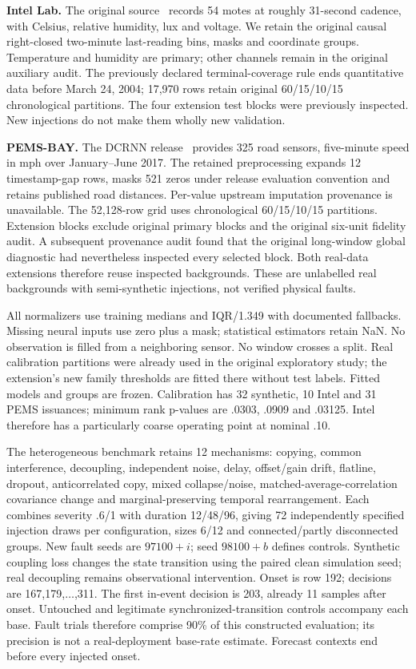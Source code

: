 \documentclass[conference]{IEEEtran}
\begin{document}
\textbf{Intel Lab.} The original source~\cite{intel} records 54 motes at roughly
31-second cadence, with Celsius, relative humidity, lux and voltage. We retain
the original causal right-closed two-minute last-reading bins, masks and
coordinate groups. Temperature and humidity are primary; other channels remain
in the original auxiliary audit. The previously declared terminal-coverage
rule ends quantitative data before March 24, 2004; 17,970 rows retain original
60/15/10/15 chronological partitions. The four extension test blocks were
previously inspected. New injections do not make them wholly new validation.

\textbf{PEMS-BAY.} The DCRNN release~\cite{dcrnn} provides 325 road sensors,
five-minute speed in mph over January--June 2017. The retained preprocessing
expands 12 timestamp-gap rows, masks 521 zeros under release evaluation
convention and retains published road distances. Per-value upstream imputation
provenance is unavailable. The 52,128-row grid uses chronological 60/15/10/15
partitions. Extension blocks exclude original primary blocks and the original
six-unit fidelity audit. A subsequent provenance audit found that the original
long-window global diagnostic had nevertheless inspected every selected block.
Both real-data extensions therefore reuse inspected backgrounds. These are unlabelled real backgrounds
with semi-synthetic injections, not verified physical faults.

All normalizers use training medians and IQR/1.349 with documented fallbacks.
Missing neural inputs use zero plus a mask; statistical estimators retain NaN.
No observation is filled from a neighboring sensor. No window crosses a split.
Real calibration partitions were already used in the original exploratory
study; the extension's new family thresholds are fitted there without test
labels. Fitted models and groups are frozen. Calibration has 32 synthetic,
10 Intel and 31 PEMS issuances; minimum rank p-values are .0303, .0909 and .03125.
Intel therefore has a particularly coarse operating point at nominal .10.

The heterogeneous benchmark retains 12 mechanisms: copying, common interference,
decoupling, independent noise, delay, offset/gain drift, flatline, dropout,
anticorrelated copy, mixed collapse/noise, matched-average-correlation covariance
change and marginal-preserving temporal rearrangement. Each combines severity
.6/1 with duration 12/48/96, giving 72 independently specified injection draws
per configuration, sizes 6/12 and connected/partly disconnected groups. New
fault seeds are $97100+i$; seed $98100+b$ defines controls. Synthetic coupling
loss changes the state transition using the paired clean simulation seed;
real decoupling remains observational intervention. Onset is row 192; decisions
are 167,179,$\ldots$,311. The first in-event decision is 203, already 11 samples
after onset. Untouched and legitimate synchronized-transition controls accompany
each base. Fault trials therefore comprise 90\% of this constructed evaluation; its precision is not a real-deployment base-rate estimate. Forecast contexts end before every injected onset.
\end{document}
